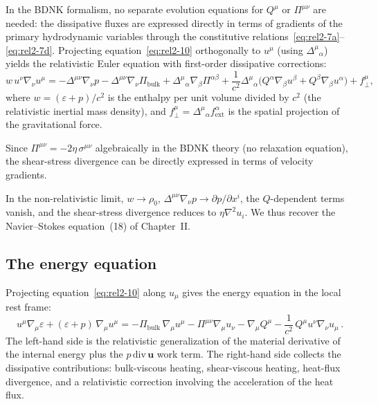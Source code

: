 In the BDNK formalism, no separate evolution equations for $Q^\mu$ or
$\Pi^{\mu\nu}$ are needed: the dissipative fluxes are expressed directly
in terms of gradients of the primary hydrodynamic variables through
the constitutive relations~\eqref{eq:rel2-7a}--\eqref{eq:rel2-7d}.
Projecting equation~\eqref{eq:rel2-10} orthogonally to $u^\mu$ (using
$\Delta^{\mu}{}_{\alpha}$) yields the relativistic Euler equation with
first-order dissipative corrections:
\begin{equation}
\label{eq:rel2-12}
  w\, u^\nu\nabla_\nu u^\mu
  = -\Delta^{\mu\nu}\nabla_\nu p
    - \Delta^{\mu\nu}\nabla_\nu \Pi_{\mathrm{bulk}}
    + \Delta^{\mu}{}_{\alpha}\nabla_\beta\Pi^{\alpha\beta}
    + \frac{1}{c^2}\Delta^{\mu}{}_{\alpha}\bigl(
        Q^\alpha\nabla_\beta u^\beta
      + Q^\beta\nabla_\beta u^\alpha
      \bigr)
    + f^\mu_{\perp},
\end{equation}
where $w = (\varepsilon + p)/c^2$ is the enthalpy per unit volume divided by
$c^2$ (the relativistic inertial mass density), and
$f^\mu_\perp = \Delta^{\mu}{}_\alpha f^\alpha_{\mathrm{ext}}$
is the spatial projection of the gravitational force.

Since $\Pi^{\mu\nu} = -2\eta\,\sigma^{\mu\nu}$ algebraically in the BDNK
theory (no relaxation equation), the shear-stress divergence can be
directly expressed in terms of velocity gradients.

In the non-relativistic limit, $w \to \rho_0$,
$\Delta^{\mu\nu}\nabla_\nu p \to \partial p / \partial x^i$, the
$Q$-dependent terms vanish, and the shear-stress divergence reduces to
$\eta\nabla^2 u_i$.  We thus recover the Navier--Stokes equation~(18) of
Chapter~II.

\subsection{The energy equation}\label{sec:rel7d}

Projecting equation~\eqref{eq:rel2-10} along $u_\mu$ gives the energy
equation in the local rest frame:
\begin{equation}
\label{eq:rel2-13}
  u^\mu\nabla_\mu\varepsilon
  + (\varepsilon + p)\,\nabla_\mu u^\mu
  = -\Pi_{\mathrm{bulk}}\,\nabla_\mu u^\mu
    - \Pi^{\mu\nu}\nabla_\mu u_\nu
    - \nabla_\mu Q^\mu
    - \frac{1}{c^2}\,Q^\mu u^\nu\nabla_\nu u_\mu\,.
\end{equation}
The left-hand side is the relativistic generalization of the material
derivative of the internal energy plus the $p\,\mathrm{div}\,\mathbf{u}$
work term.  The right-hand side collects the dissipative contributions:
bulk-viscous heating, shear-viscous heating, heat-flux divergence, and
a relativistic correction involving the acceleration of the heat flux.


